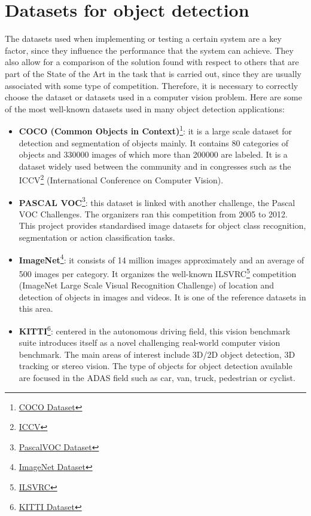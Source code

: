 \section{Datasets for object detection}
The datasets used when implementing or testing a certain system are a key factor, since they influence the performance that the system can achieve. They also allow for a comparison of the solution found with respect to others that are part of the State of the Art in the task that is carried out, since they are usually associated with some type of competition. Therefore, it is necessary to correctly choose the dataset or datasets used in a computer vision problem. Here are some of the most well-known datasets used in many object detection applications:
\begin{itemize}
\item \textbf{COCO (Common Objects in Context)}\footnote{\href{http://cocodataset.org/#home}{COCO Dataset}}: it is a large scale dataset for detection and segmentation of objects mainly. It contains 80 categories of objects and 330000 images of which more than 200000 are labeled. It is a dataset widely used between the community and in congresses such as the ICCV\footnote{\href{http://iccv2019.thecvf.com/}{ICCV}} (International Conference on Computer Vision).
\item \textbf{PASCAL VOC}\footnote {\href{http://host.robots.ox.ac.uk/pascal/VOC/}{PascalVOC Dataset}}: this dataset is linked with another challenge, the Pascal VOC Challenges. The organizers ran this competition from 2005 to 2012. This project provides standardised image datasets for object class recognition, segmentation or action classification tasks.
\item \textbf{ImageNet}\footnote {\href{http://www.image-net.org/}{ImageNet Dataset}}: it consists of 14 million images approximately and an average of 500 images per category. It organizes the well-known ILSVRC\footnote{\href{http://image-net.org/challenges/LSVRC/}{ILSVRC}} competition (ImageNet Large Scale Visual Recognition Challenge) of location and detection of objects in images and videos. It is one of the reference datasets in this area.
\item \textbf{KITTI}\footnote {\href{http://www.cvlibs.net/datasets/kitti/}{KITTI Dataset}}: centered in the autonomous driving field, this vision benchmark suite introduces itself as a novel challenging real-world computer vision benchmark. The main areas of interest include 3D/2D object detection, 3D tracking or stereo vision. The type of objects for object detection available are focused in the ADAS field such as car, van, truck, pedestrian or cyclist.

\end{itemize}
